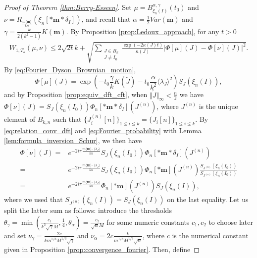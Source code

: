 \documentclass[10pt,11pt]{amsart}%
\begin{document}
\begin{proof}[Proof of Theorem \ref{thm:Berry-Esseen}]
Set $\mu=B^{\alpha,\gamma}_{\xi_n(I)}\left(t_0\right)$ and $\nu=R_{\frac{m\langle\mathbf{m}\rangle}{kn}}\left(\xi_{n}\left[\ast \mathbf{m}*\delta_I\right]\right)$, and recall that $\alpha=\frac{1}{2}Var(\mathbf{m})$ and $\gamma=\frac{k}{2(k^2-1)}K(\mathbf{m})$. By Proposition \ref{prop:Ledoux_approach}, for any $t>0$
\begin{align}
W_{1, T_{k}}(\mu,\nu)\leq 2\sqrt{2t}k+\sqrt{\sum_{\substack{J\in B_{k}\\J\not=I_0}}\frac{\exp(-2\kappa(J)t)}{\kappa(J)}\left\vert \Phi[\mu](J)-\Phi[\nu](J)\right\vert^2}.\label{eq:proof_thm_1_recall_Wasser}
\end{align}
By \eqref{eq:Fourier_Dyson_Brownian_motion}, 
\begin{equation}\label{eq:formula_Phi_mu}
\Phi[\mu](J)=\exp\left(-t_0\frac{\gamma}{k} K(\tilde{J})-t_0\frac{\alpha}{k^2}\langle\lambda_J\rangle^2\right)S_{J}(\xi_n(I)),
\end{equation}
and by Proposition \ref{prop:equiv_dft_cft}, when $\Vert \tilde{J}\Vert_{\infty}< \frac{n}{2}$ we have $\Phi[\nu](J)=S_{J}(\xi_n(I_0))\Phi_n[*\mathbf{m}*\delta_I](J^{(n)})$, where $J^{(n)}$ is the unique element of $B_{k,n}$ such that $\{J^{(n)}_i[n]\}_{1\leq i\leq k}=\{J_i[n]\}_{1\leq i\leq k}$. By \eqref{eq:relation_conv_dft} and \eqref{eq:Fourier_probability} with Lemma \ref{lem:formula_inversion_Schur}, we then have 
\begin{align}
\Phi[\nu](J)=&e^{-2i \pi \frac{m\langle\mathbf{m}\rangle\cdot\langle \lambda_J\rangle}{kn}}S_{J}(\xi_n(I_0))\Phi_n[*\mathbf{m}*\delta_I](J^{(n)})\nonumber\\
=&e^{-2i \pi \frac{m\langle\mathbf{m}\rangle\cdot\langle \lambda_J\rangle}{kn}}S_{J}(\xi_n(I_0))\Phi_n[*\mathbf{m}](J^{(n)})\frac{S_{J^{(n)}}(\xi_n(I_0))}{S_{J^{(n)}}(\xi_n(I_0))}\nonumber\\
=&e^{-2i \pi \frac{m\langle\mathbf{m}\rangle\cdot\langle \lambda_J\rangle}{kn}}\Phi_n[*\mathbf{m}](J^{(n)})S_{J}(\xi_n(I)),\label{eq:formula_Phi_nu}
\end{align}
where we used that $S_{J^{(n)}}(\xi_n(I))=S_{J}(\xi_n(I))$ on the last equality.
Let us split the latter sum as follows: introduce the thresholds $\theta_{\gamma}=\min(\frac{c_1}{k^3\sqrt{\gamma}M},\frac{1}{4},\theta_{\alpha})=\frac{c_2}{\sqrt{\alpha}M}$ for some numeric constants $c_1,c_2$ to choose later and set $\nu_{\gamma}= \frac{2c}{km^{1/3}M^{1/3}\sqrt{\gamma}}$ and $\nu_{\alpha}= 2c\frac{k}{m^{1/3}M^{1/3}\sqrt{\alpha}}$, where $c$ is the numerical constant given in Proposition \ref{prop:convergence_fourier}. Then, define

\end{proof}
\end{document}
